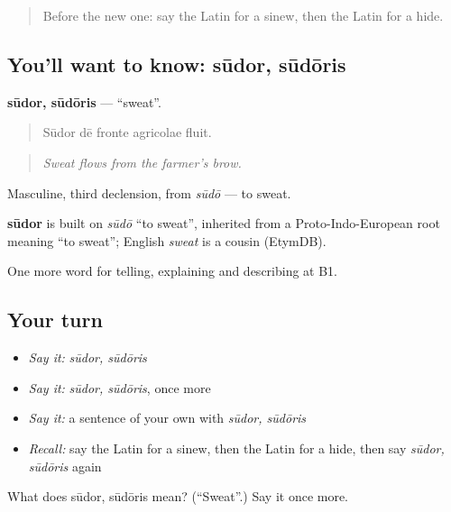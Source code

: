\begin{quote}
Before the new one: say the Latin for a sinew, then the Latin for a hide.
\end{quote}

\subsection*{You'll want to know: sūdor, sūdōris}
\textbf{sūdor, sūdōris} — \textquotedblleft{}sweat\textquotedblright{}.

\begin{quote}
Sūdor dē fronte agricolae fluit.
\end{quote}

\begin{quote}
\emph{Sweat flows from the farmer's brow.}
\end{quote}

Masculine, third declension, from \emph{sūdō} — to sweat.

\begin{cousinweb}
\textbf{sūdor} is built on \emph{sūdō} \textquotedblleft{}to sweat\textquotedblright{}, inherited from a Proto-Indo-European root meaning \textquotedblleft{}to sweat\textquotedblright{}; English \emph{sweat} is a cousin (EtymDB).
\end{cousinweb}

\begin{grammarlens}[title={What you've built}]
One more word for telling, explaining and describing at B1.
\end{grammarlens}

\subsection*{Your turn}
\begin{itemize}
\raggedright
  \item \emph{Say it:} \emph{sūdor, sūdōris}
  \item \emph{Say it:} \emph{sūdor, sūdōris}, once more
  \item \emph{Say it:} a sentence of your own with \emph{sūdor, sūdōris}
  \item \emph{Recall:} say the Latin for a sinew, then the Latin for a hide, then say \emph{sūdor, sūdōris} again
\end{itemize}

\begin{tcolorbox}[breakable,colback=teal!4,colframe=teal!35!black,title={Before you move on}]
What does sūdor, sūdōris mean? (\textquotedblleft{}Sweat\textquotedblright{}.) Say it once more.
\end{tcolorbox}
